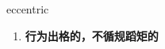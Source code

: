 
\begin{frame}
{\huge eccentric}
\begin{center}
\begin{enumerate}\Large
  \item \textbf{行为出格的，不循规蹈矩的}
\end{enumerate}
\end{center}
\end{frame}
